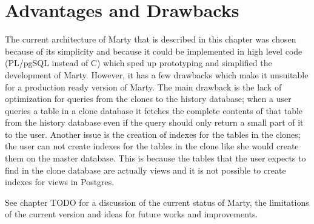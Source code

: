 \section{Advantages and Drawbacks}
The current architecture of Marty that is described in this chapter was chosen because of its simplicity and because it could be implemented in high level code (PL/pgSQL instead of C) which sped up prototyping and simplified the development of Marty.
However, it has a few drawbacks which make it unsuitable for a production ready version of Marty.
The main drawback is the lack of optimization for queries from the clones to the history database; when a user queries a table in a clone database it fetches the complete contents of that table from the history database even if the query should only return a small part of it to the user.
Another issue is the creation of indexes for the tables in the clones; the user can not create indexes for the tables in the clone like she would create them on the master database.
This is because the tables that the user expects to find in the clone database are actually views and it is not possible to create indexes for views in Postgres.

See chapter TODO for a discussion of the current status of Marty, the limitations of the current version and ideas for future works and improvements.
